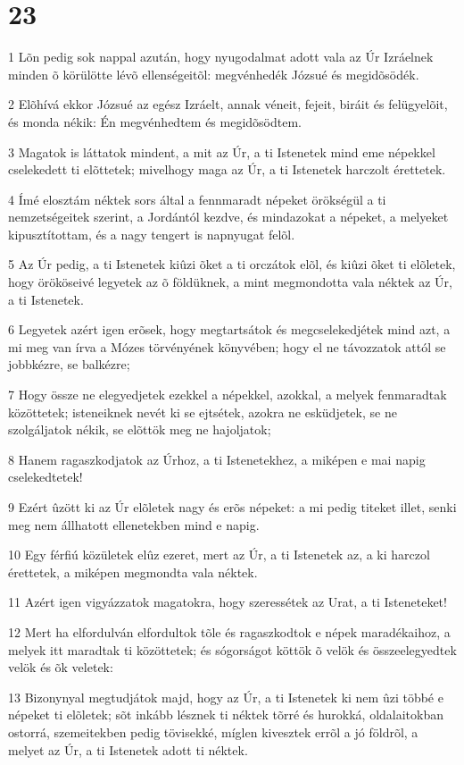 \chapter{23}

\par 1 Lõn pedig sok nappal azután, hogy nyugodalmat adott vala az Úr Izráelnek minden õ körülötte lévõ ellenségeitõl: megvénhedék Józsué  és megidõsödék.
\par 2 Elõhívá ekkor Józsué az egész Izráelt, annak véneit, fejeit, biráit és felügyelõit, és monda nékik: Én megvénhedtem és megidõsödtem.
\par 3 Magatok is láttatok mindent, a mit az Úr, a ti Istenetek mind eme népekkel cselekedett ti elõttetek; mivelhogy maga az Úr, a ti Istenetek harczolt érettetek.
\par 4 Ímé elosztám néktek sors által a fennmaradt népeket örökségül a ti nemzetségeitek szerint, a Jordántól kezdve, és mindazokat a népeket, a melyeket kipusztítottam, és a nagy tengert is napnyugat felõl.
\par 5 Az Úr pedig, a ti Istenetek kiûzi õket a ti orczátok elõl, és kiûzi õket ti elõletek, hogy örököseivé legyetek az õ földüknek, a mint megmondotta vala néktek az Úr, a ti Istenetek.
\par 6 Legyetek azért igen erõsek, hogy megtartsátok és megcselekedjétek mind azt, a mi meg van írva a Mózes törvényének könyvében; hogy el ne távozzatok attól se jobbkézre, se balkézre;
\par 7 Hogy össze ne elegyedjetek ezekkel a népekkel, azokkal, a melyek fenmaradtak közöttetek; isteneiknek nevét ki se ejtsétek,  azokra ne esküdjetek, se ne szolgáljatok nékik, se elõttök meg ne hajoljatok;
\par 8 Hanem ragaszkodjatok az Úrhoz, a ti Istenetekhez, a miképen e mai napig cselekedtetek!
\par 9 Ezért ûzött ki az Úr elõletek nagy és erõs népeket: a mi pedig titeket illet, senki meg nem állhatott ellenetekben mind e napig.
\par 10 Egy férfiú közületek elûz ezeret, mert az Úr, a ti Istenetek az, a ki harczol érettetek, a miképen megmondta vala néktek.
\par 11 Azért igen vigyázzatok magatokra, hogy szeressétek az Urat, a ti Isteneteket!
\par 12 Mert ha elfordulván elfordultok tõle és ragaszkodtok e népek maradékaihoz, a melyek itt maradtak ti közöttetek; és sógorságot köttök õ velök és összeelegyedtek velök és õk veletek:
\par 13 Bizonynyal megtudjátok majd, hogy az Úr, a ti Istenetek ki nem ûzi többé e népeket ti elõletek; sõt inkább lésznek ti néktek tõrré és hurokká, oldalaitokban ostorrá, szemeitekben pedig tövisekké, míglen kivesztek errõl a jó földrõl, a melyet az Úr, a ti Istenetek adott ti néktek.
